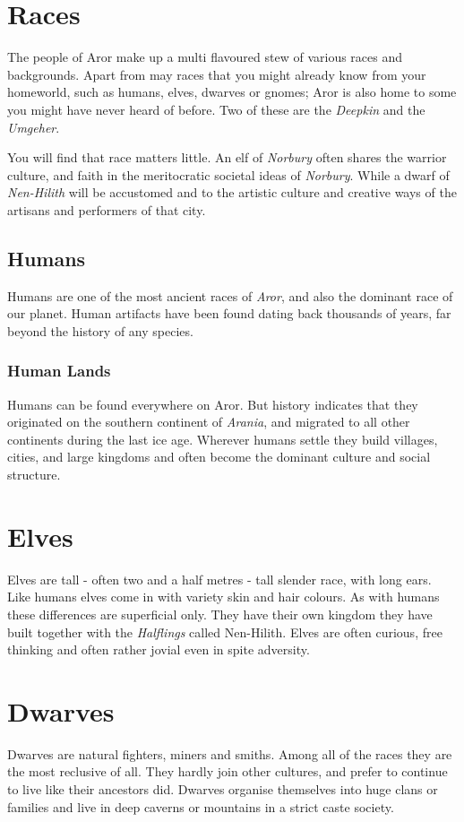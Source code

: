 \twocolumn
\section*{Races}

The people of Aror make up a multi flavoured stew of various races and
backgrounds. Apart from may races that you might already know from your
homeworld, such as humans, elves, dwarves or gnomes; Aror is also home to some
you might have never heard of before. Two of these are the
\emph{Deepkin} and the \emph{Umgeher}.

You will find that race matters little. An elf of \emph{Norbury} often shares
the warrior culture, and faith in the meritocratic societal ideas
of \emph{Norbury}. While a dwarf of \emph{Nen-Hilith} will be accustomed and
to the artistic culture and creative ways of the artisans and performers of
that city.

\subsection*{Humans}

Humans are one of the most ancient races of \emph{Aror}, and also the dominant
race of our planet. Human artifacts have been found dating back thousands of
years, far beyond the history of any species.

\subsubsection*{Human Lands}

Humans can be found everywhere on Aror. But history indicates that they
originated on the southern continent of \emph{Arania}, and migrated to all
other continents during the last ice age. Wherever humans settle they build
villages, cities, and large kingdoms and often become the dominant culture and
social structure.

\section*{Elves}

Elves are tall - often two and a half metres - tall slender race, with long
ears. Like humans elves come in with variety skin and hair colours.  As with
humans these differences are superficial only. They have their own kingdom
they have built together with the \emph{Halflings} called Nen-Hilith. Elves
are often curious, free thinking and often rather jovial even in spite
adversity.

\section*{Dwarves}

Dwarves are natural fighters, miners and smiths. Among all of the races they
are the most reclusive of all. They hardly join other cultures, and prefer to
continue to live like their ancestors did. Dwarves organise themselves into
huge clans or families and live in deep caverns or mountains in a strict caste
society.


